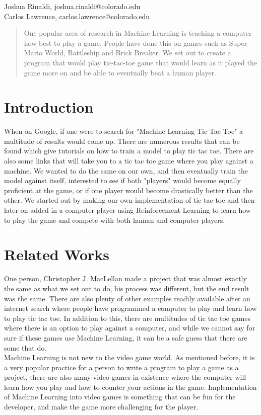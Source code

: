 \documentclass{article}
\begin{document}

\begin{center}
Joshua Rinaldi, joshua.rinaldi@colorado.edu\\
Carlos Lawrence, carlos.lawrence@colorado.edu
\end{center} 
\vskip 0.3in

\begin{abstract}
One popular area of research in Machine Learning is teaching a computer how best to play a game. People have done this on games such as Super Mario World, Battleship and Brick Breaker. We set out to create a program that would play tic-tac-toe game that would learn as it played the game more on and be able to eventually beat a human player.
\end{abstract}

\section*{Introduction}
When on Google, if one were to search for "Machine Learning Tic Tac Toe" a multitude of results would come up. There are numerous results that can be found which give tutorials on how to train a model to play tic tac toe. There are also some links that will take you to a tic tac toe game where you play against a machine. We wanted to do the same on our own, and then eventually train the model against itself, interested to see if both "players" would become equally proficient at the game, or if one player would become drastically better than the other. We started out by making our own implementation of tic tac toe and then later on added in a computer player using Reinforcement Learning to learn how to play the game and compete with both human and computer players.

\section*{Related Works}
One person, Christopher J. MacLellan made a project that was almost exactly the same as what we set out to do, his process was different, but the end result was the same. There are also plenty of other examples readily available after an internet search where people have programmed a computer to play and learn how to play tic tac toe. In addition to this, there are multitudes of tic tac toe games where there is an option to play against a computer, and while we cannot say for sure if these games use Machine Learning, it can be a safe guess that there are some that do. \\
Machine Learning is not new to the video game world. As mentioned before, it is a very popular practice for a person to write a program to play a game as a project, there are also many video games in existence where the computer will learn how you play and how to counter your actions in the game. Implementation of Machine Learning into video games is something that can be fun for the developer, and make the game more challenging for the player.
\end{document}
